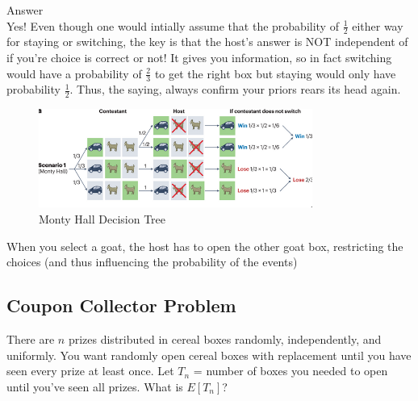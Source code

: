 \documentclass[a4paper]{article}
\begin{document}
\begin{note}{Answer}\\
  Yes! Even though one would intially assume that the probability of $\frac{1}{2}$ either way for staying or 
  switching, the key is that the host's answer is NOT independent of if you're choice is correct or not! It
  gives you information, so in fact switching would have a probability of $\frac{2}{3}$ to get the 
  right box but staying would only have probability $\frac{1}{2}$. Thus, the saying, always confirm 
  your priors rears its head again.
\end{note}

\begin{figure}[h]
  \centering
  \includegraphics[width=0.8\textwidth]{assets/monty_hall_decision_tree.png}
  \caption{Monty Hall Decision Tree}
  \label{fig:monty_hall_decision_tree}
\end{figure}
When you select a goat, the host has to open the other goat box, restricting the choices (and thus influencing the 
probability of the events)

\subsection{Coupon Collector Problem}
There are $n$ prizes distributed in cereal boxes randomly, independently, and uniformly. 
You want randomly open cereal boxes with replacement until you have seen every prize at least once. 
Let $T_n$ = number of boxes you needed to open until you've seen all prizes. 
What is  $E[T_n]$?
\end{document}
